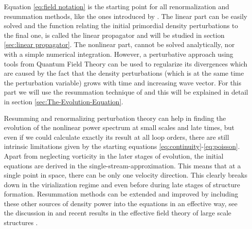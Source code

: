 




Equation \ref{eq:field notation} is the starting point for all renormalization
and resummation methods, like the ones introduced by \cite{crocce_renormalized_2005,bernardeau_evolution_2013,bernardeau_constructing_2012,
	valageas_matter_2013,anselmi_nonlinear_2012,anselmi_next--leading_2010}.
The linear part can be easily solved and the function relating the
initial primordial density perturbations to the final one, is called
the linear propagator and will be studied in section \ref{sec:linear propagator}.
The nonlinear part, cannot be solved analytically, nor with a simple
numerical integration.
However, a perturbative approach using tools from Quantum Field Theory
can be used to regularize its divergences which are caused by the
fact that the density perturbations (which is at the same time the
perturbation variable) grows with time and increasing wave vector.
For this part we will use the resummation technique of \cite{anselmi_nonlinear_2012}
and this will be explained in detail in section \ref{sec:The-Evolution-Equation}.

Resumming and renormalizing perturbation theory can help in finding the evolution
of the nonlinear power spectrum at small scales and late times, but
even if we could calculate exactly its result at all loop orders,
there are still intrinsic limitations given by the starting equations
\ref{eq:continuity}-\ref{eq:poisson}. Apart from neglecting vorticity
in the later stages of evolution, the initial equations are derived
in the single-stream-approximation. This means that at a single point
in space, there can be only one velocity direction. This clearly breaks
down in the virialization regime and even before during late stages of structure formation. 
Resummation methods
can be extended and improved by including these other sources of density
power into the equations in an effective way, see the discussion in
\cite{manzotti_coarse_2014,pietroni_coarse-grained_2011} and recent
results in the effective field theory of large scale structures \cite{baumann_cosmological_2012,pajer_renormalization_2013,senatore_ir-resummed_2014,carrasco_effective_2012}.

